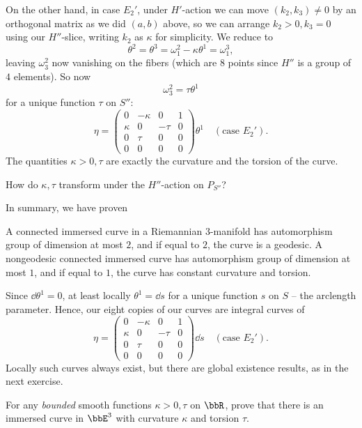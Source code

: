 On the other hand, in case $E_2'$, under $H'$-action we can move $(k_2,k_3)\neq 0$ by an orthogonal matrix as we did $(a,b)$ above, so we can arrange $k_2>0,k_3=0$ using our $H''$-slice, writing $k_2$ as $\kappa$ for simplicity. We reduce to 
\[\theta^2=\theta^3=\omega^2_1-\kappa\theta^1=\omega^3_1,\]
leaving $\omega^2_3$ now vanishing on the fibers (which are $8$ points since $H''$ is a group of $4$ elements). So now 
\[\omega^2_3=\tau\theta^1\]
for a unique function $\tau$ on $S''$:
\[\eta=\begin{pmatrix}
    0 & -\kappa & 0 & 1\\
    \kappa & 0 & -\tau & 0\\
    0 & \tau & 0 & 0\\
    0 & 0 & 0 & 0
\end{pmatrix}\theta^1 \quad (\text{case }E_2').\]
The quantities $\kappa>0,\tau$ are exactly the curvature and the torsion of the curve.

\begin{xca}
    How do $\kappa,\tau$ transform under the $H''$-action on $P_{S''}$?
\end{xca}

In summary, we have proven 

\begin{thm}
    A connected immersed curve in a Riemannian $3$-manifold has automorphism group of dimension at most $2$, and if equal to $2$, the curve is a geodesic. A nongeodesic connected immersed curve has automorphism group of dimension at most $1$, and if equal to $1$, the curve has constant curvature and torsion.
\end{thm}

Since $\dd\theta^1=0$, at least locally $\theta^1=\dd s$ for a unique function $s$ on $S$ -- the arclength parameter. Hence, our eight copies of our curves are integral curves of 
\[\eta=\begin{pmatrix}
    0 & -\kappa & 0 & 1\\
    \kappa & 0 & -\tau & 0\\
    0 & \tau & 0 & 0\\
    0 & 0 & 0 & 0
\end{pmatrix}\dd s \quad (\text{case }E_2').\]
Locally such curves always exist, but there are global existence results, as in the next exercise. 

\begin{xca}
    For any \emph{bounded} smooth functions $\kappa>0,\tau$ on $\bbR$, prove that there is an immersed curve in $\bbE^3$ with curvature $\kappa$ and torsion $\tau$.
\end{xca}

